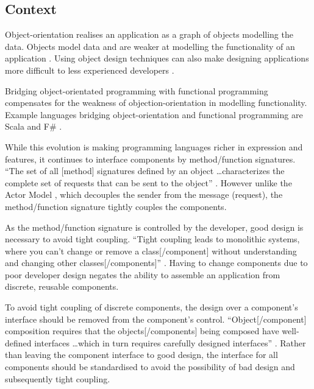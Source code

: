 \documentclass[prodmode]{style/acmlarge}
\begin{document}
\subsection{Context}



Object-orientation realises an application as a graph of objects modelling the
data.  Objects model data and are weaker at modelling the functionality of an
application \cite{oo-behaviour}.  Using object design techniques can also make
designing applications more difficult to less experienced developers
\cite{oo-design}.

Bridging object-orientated programming with functional programming
\cite{bridging-function-oo} compensates for the weakness of
objection-orientation in modelling functionality.  Example languages bridging
object-orientation and functional programming are Scala \cite{scala} and F\#
\cite{f-sharp}.

While this evolution is making programming languages richer in expression and
features, it continues to interface components by method/function signatures.
``The set of all [method] signatures defined by an object \ldots characterizes
the complete set of requests that can be sent to the object'' \cite[p. 13]{gof}.
 However unlike the Actor Model \cite{actors}, which decouples the sender from
the message (request), the method/function signature tightly couples the
components.

As the method/function signature is controlled by the developer, good design is
necessary to avoid tight coupling.  ``Tight coupling leads to monolithic
systems, where you can't change or remove a class[/component] without
understanding and changing other classes[/components]'' \cite[p. 24-25]{gof}.
Having to change components due to poor developer design negates the ability to
assemble an application from discrete, reusable components.

To avoid tight coupling of discrete components, the design over a component's
interface should be removed from the component's control. ``Object[/component]
composition requires that the objects[/components] being composed have
well-defined interfaces \ldots which in turn requires carefully designed
interfaces'' \cite[p. 19]{gof}.  Rather than leaving the component interface to
good design, the interface for all components should be standardised to avoid
the possibility of bad design and subsequently tight coupling.
\end{document}
